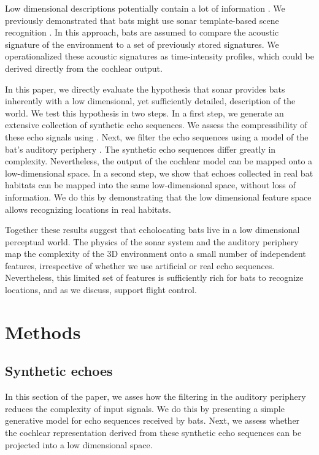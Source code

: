 \documentclass[preprint,5p]{elsarticle}
\begin{document}
Low dimensional descriptions potentially contain a lot of information \citep{Kuc1997b,Kuc1997}. We previously demonstrated that bats might use sonar template-based scene recognition \citep{Vanderelst2016,Vanderelst2017}. In this approach, bats are assumed to compare the acoustic signature of the environment to a set of previously stored signatures. We operationalized these acoustic signatures as time-intensity profiles, which could be derived directly from the cochlear output.

In this paper, we directly evaluate the hypothesis that sonar provides bats inherently with a low dimensional, yet sufficiently detailed, description of the world. We test this hypothesis in two steps. In a first step, we generate an extensive collection of synthetic echo sequences. We assess the compressibility of these echo signals using \PCA. Next, we filter the echo sequences using a model of the bat's auditory periphery \citep{Wiegrebe2008}. The synthetic echo sequences differ greatly in complexity. Nevertheless, the output of the cochlear model can be mapped onto a low-dimensional space. In a second step, we show that echoes collected in real bat habitats can be mapped into the same low-dimensional space, without loss of information. We do this by demonstrating that the low dimensional feature space allows recognizing locations in real habitats. 

Together these results suggest that echolocating bats live in a low dimensional perceptual world. The physics of the sonar system and the auditory periphery map the complexity of the 3D environment onto a small number of independent features, irrespective of whether we use artificial or real echo sequences. Nevertheless, this limited set of features is sufficiently rich for bats to recognize locations, and as we discuss, support flight control.

\section{Methods}

\subsection{Synthetic echoes}

In this section of the paper, we asses how the filtering in the auditory periphery reduces the complexity of input signals. We do this by presenting a simple generative model for echo sequences received by bats. Next, we assess whether the cochlear representation derived from these synthetic echo sequences can be projected into a low dimensional space. 
\end{document}
